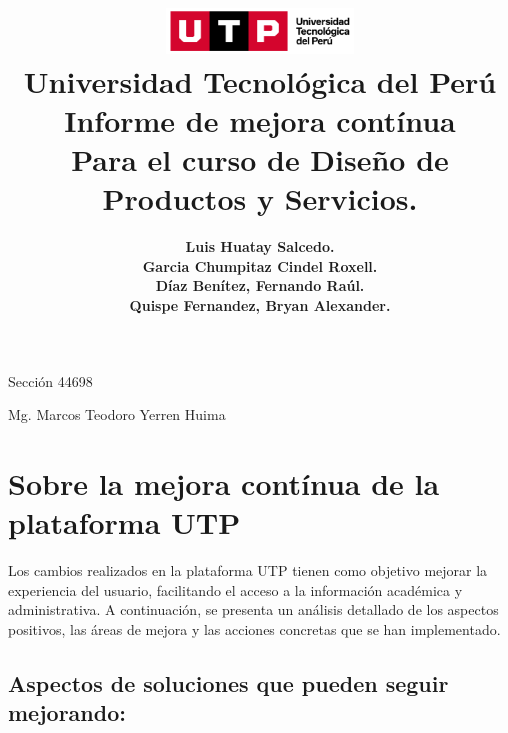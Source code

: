 \documentclass{article}
\title{
  \includegraphics[width=5cm]{./assets/logo-utp.png} \\
  \vspace{1cm}
  \textbf{Universidad Tecnológica del Perú} \\
  \vspace{2cm}
  \textbf{Informe de mejora contínua} \\
  \vspace{1cm}
  \large \textbf{Para el curso de Diseño de Productos y Servicios.}
}
\author{
  \textbf{Luis Huatay Salcedo.} \\
  \textbf{Garcia Chumpitaz Cindel Roxell.} \\
  \textbf{Díaz Benítez, Fernando Raúl.} \\
  \textbf{Quispe Fernandez, Bryan Alexander.}
}
\begin{document}
\maketitle
\begin{center}
  Sección 44698
\end{center}
\thispagestyle{empty}
\begin{center}
  Mg. Marcos Teodoro Yerren Huima  
\end{center}
\restoregeometry




\newpage


\section{Sobre la mejora contínua de la plataforma UTP}

Los cambios realizados en la plataforma UTP tienen como objetivo mejorar la experiencia del usuario, facilitando el acceso a la información académica y administrativa. A continuación, se presenta un análisis detallado de los aspectos positivos, las áreas de mejora y las acciones concretas que se han implementado.

\subsection*{Aspectos de soluciones que pueden seguir mejorando:}
\end{document}
